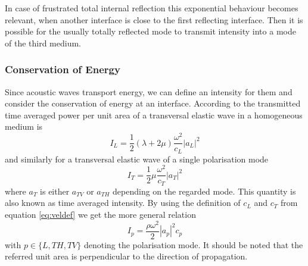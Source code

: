 In case of frustrated total internal reflection this exponential behaviour
becomes relevant, when another interface is close to the first reflecting
interface. Then it is possible for the usually totally reflected mode to
transmit intensity into a mode of the third medium.

\subsubsection{Conservation of Energy} \label{sec:sanitycheck}
Since acoustic waves transport energy, we can define an intensity for them and
consider the conservation of energy at an interface.
According to \cite[166]{achenbach1973wave} the transmitted time averaged power
per unit area of a transversal elastic wave in a homogeneous medium is
\begin{equation}
    I_L = \frac{1}{2}(\lambda+2\mu)\frac{\omega^2}{c_L}|a_L|^2
\end{equation}
and similarly for a transversal elastic wave of a single polarisation mode
\begin{equation}
    I_T = \frac{1}{2}\mu\frac{\omega^2}{c_T}|a_T|^2
\end{equation}
where $a_T$ is either $a_{TV}$ or $a_{TH}$ depending on the regarded mode. This
quantity is also known as time averaged intensity. By using the definition of
$c_L$ and $c_T$ from equation \ref{eq:veldef} we get the more general relation
\begin{equation} \label{eq:generalIntensity}
    I_p = \frac{\rho\omega^2}{2} |a_p|^2 c_p
\end{equation}
with $p\in \{L,TH, TV\}$ denoting the polarisation mode. It should be noted
that the referred unit area is perpendicular to the direction of propagation.

